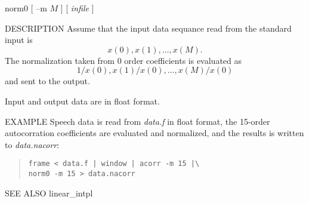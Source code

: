 
\begin{synopsis}
\item[norm0] [ --m $M$ ] [ {\em infile} ]
\end{synopsis}

\begin{qsection}{DESCRIPTION}
Assume that the input data sequance read from the standard input
is
\begin{displaymath}
x(0), x(1), \ldots, x(M).
\end{displaymath}
The normalization taken from 0 order coefficients is evaluated as
\begin{displaymath}
1/x(0), x(1)/x(0), \ldots, x(M)/x(0)
\end{displaymath}
and sent to the output.
\par
Input and output data are in float format.
\end{qsection}

\begin{options}
\end{options}

\begin{qsection}{EXAMPLE}
Speech data is read from {\em data.f} in float format,
the 15-order autocorration coefficients are evaluated
and normalized, and the results is written to {\em data.nacorr}:
\begin{quote}
  \verb!frame < data.f | window | acorr -m 15 |\ !\\
  \verb!norm0 -m 15 > data.nacorr!
\end{quote}
\end{qsection}

\begin{qsection}{SEE ALSO}
 linear\_intpl
\end{qsection}
